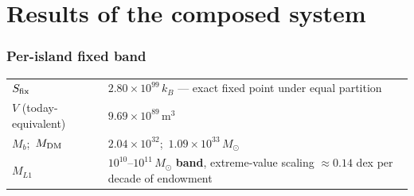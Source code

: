 \documentclass[11pt]{article}
\begin{document}
\clearpage

\part{Results of the composed system}
\setcounter{section}{0}\setcounter{equation}{0}\setcounter{figure}{0}

\section{Per-island fixed band}
\begin{center}\small
\begin{tabular}{ll}\toprule
$S_{\rm fix}$ & $2.80\times10^{99}\,k_B$ --- exact fixed point under equal partition\\
$V$ (today-equivalent) & $9.69\times10^{89}$\,m$^3$\\
$M_b$;\ $M_{\rm DM}$ & $2.04\times10^{32}$;\ $1.09\times10^{33}\,M_\odot$\\
$M_{L1}$ & $10^{10}$--$10^{11}\,M_\odot$ \textbf{band}, extreme-value scaling $\approx0.14$ dex per decade of endowment\\
\bottomrule\end{tabular}\end{center}
\end{document}
